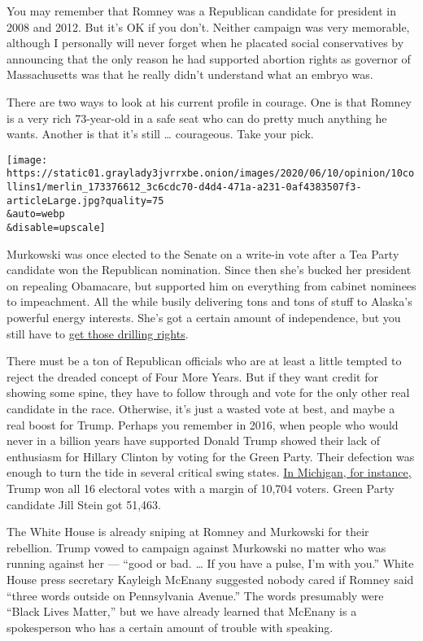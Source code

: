 You may remember that Romney was a Republican candidate for president in
2008 and 2012. But it's OK if you don't. Neither campaign was very
memorable, although I personally will never forget when he placated
social conservatives by announcing that the only reason he had supported
abortion rights as governor of Massachusetts was that he really didn't
understand what an embryo was.

There are two ways to look at his current profile in courage. One is
that Romney is a very rich 73-year-old in a safe seat who can do pretty
much anything he wants. Another is that it's still \ldots{} courageous.
Take your pick.

\texttt{[image: https://static01.graylady3jvrrxbe.onion/images/2020/06/10/opinion/10collins1/merlin\_173376612\_3c6cdc70-d4d4-471a-a231-0af4383507f3-articleLarge.jpg?quality=75\\\&auto=webp\\\&disable=upscale]}

Murkowski was once elected to the Senate on a write-in vote after a Tea
Party candidate won the Republican nomination. Since then she's bucked
her president on repealing Obamacare, but supported him on everything
from cabinet nominees to impeachment. All the while busily delivering
tons and tons of stuff to Alaska's powerful energy interests. She's got
a certain amount of independence, but you still have to
\href{https://www.washingtonpost.com/news/powerpost/paloma/the-energy-202/2020/06/08/the-energy-202-lisa-murkowski-s-wins-for-alaska-help-protect-her-against-trump-attacks/5edd2548602ff12947e86583/}{get
those drilling rights}.

There must be a ton of Republican officials who are at least a little
tempted to reject the dreaded concept of Four More Years. But if they
want credit for showing some spine, they have to follow through and vote
for the only other real candidate in the race. Otherwise, it's just a
wasted vote at best, and maybe a real boost for Trump. Perhaps you
remember in 2016, when people who would never in a billion years have
supported Donald Trump showed their lack of enthusiasm for Hillary
Clinton by voting for the Green Party. Their defection was enough to
turn the tide in several critical swing states.
\href{https://www.nytimes3xbfgragh.onion/2018/11/09/opinion/third-party-midterms.html}{In
Michigan, for instance,} Trump won all 16 electoral votes with a margin
of 10,704 voters. Green Party candidate Jill Stein got 51,463.

The White House is already sniping at Romney and Murkowski for their
rebellion. Trump vowed to campaign against Murkowski no matter who was
running against her --- ``good or bad. \ldots{} If you have a pulse, I'm
with you.'' White House press secretary Kayleigh McEnany suggested
nobody cared if Romney said ``three words outside on Pennsylvania
Avenue.'' The words presumably were ``Black Lives Matter,'' but we have
already learned that McEnany is a spokesperson who has a certain amount
of trouble with speaking.

